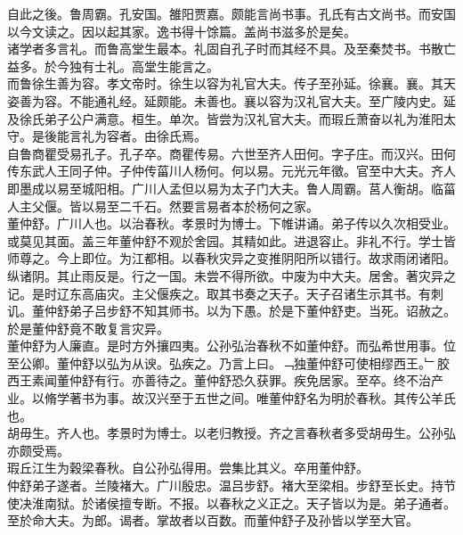 \documentclass{zhvt-classic}
\begin{document}
\hspace*{2em}自此之後。鲁周霸。孔安国。雒阳贾嘉。颇能言尚书事。孔氏有古文尚书。而安国以今文读之。因以起其家。逸书得十馀篇。盖尚书滋多於是矣。\\
\hspace*{2em}诸学者多言礼。而鲁高堂生最本。礼固自孔子时而其经不具。及至秦焚书。书散亡益多。於今独有士礼。高堂生能言之。\\
\hspace*{2em}而鲁徐生善为容。孝文帝时。徐生以容为礼官大夫。传子至孙延。徐襄。襄。其天姿善为容。不能通礼经。延颇能。未善也。襄以容为汉礼官大夫。至广陵内史。延及徐氏弟子公户满意。桓生。单次。皆尝为汉礼官大夫。而瑕丘萧奋以礼为淮阳太守。是後能言礼为容者。由徐氏焉。\\
\hspace*{2em}自鲁商瞿受易孔子。孔子卒。商瞿传易。六世至齐人田何。字子庄。而汉兴。田何传东武人王同子仲。子仲传菑川人杨何。何以易。元光元年徵。官至中大夫。齐人即墨成以易至城阳相。广川人孟但以易为太子门大夫。鲁人周霸。莒人衡胡。临菑人主父偃。皆以易至二千石。然要言易者本於杨何之家。\\
\hspace*{2em}董仲舒。广川人也。以治春秋。孝景时为博士。下帷讲诵。弟子传以久次相受业。或莫见其面。盖三年董仲舒不观於舍园。其精如此。进退容止。非礼不行。学士皆师尊之。今上即位。为江都相。以春秋灾异之变推阴阳所以错行。故求雨闭诸阳。纵诸阴。其止雨反是。行之一国。未尝不得所欲。中废为中大夫。居舍。著灾异之记。是时辽东高庙灾。主父偃疾之。取其书奏之天子。天子召诸生示其书。有刺讥。董仲舒弟子吕步舒不知其师书。以为下愚。於是下董仲舒吏。当死。诏赦之。於是董仲舒竟不敢复言灾异。\\
\hspace*{2em}董仲舒为人廉直。是时方外攘四夷。公孙弘治春秋不如董仲舒。而弘希世用事。位至公卿。董仲舒以弘为从谀。弘疾之。乃言上曰。﹁独董仲舒可使相缪西王。﹂胶西王素闻董仲舒有行。亦善待之。董仲舒恐久获罪。疾免居家。至卒。终不治产业。以脩学著书为事。故汉兴至于五世之间。唯董仲舒名为明於春秋。其传公羊氏也。\\
\hspace*{2em}胡毋生。齐人也。孝景时为博士。以老归教授。齐之言春秋者多受胡毋生。公孙弘亦颇受焉。\\
\hspace*{2em}瑕丘江生为穀梁春秋。自公孙弘得用。尝集比其义。卒用董仲舒。\\
\hspace*{2em}仲舒弟子遂者。兰陵褚大。广川殷忠。温吕步舒。褚大至梁相。步舒至长史。持节使决淮南狱。於诸侯擅专断。不报。以春秋之义正之。天子皆以为是。弟子通者。至於命大夫。为郎。谒者。掌故者以百数。而董仲舒子及孙皆以学至大官。\\
\end{document}
